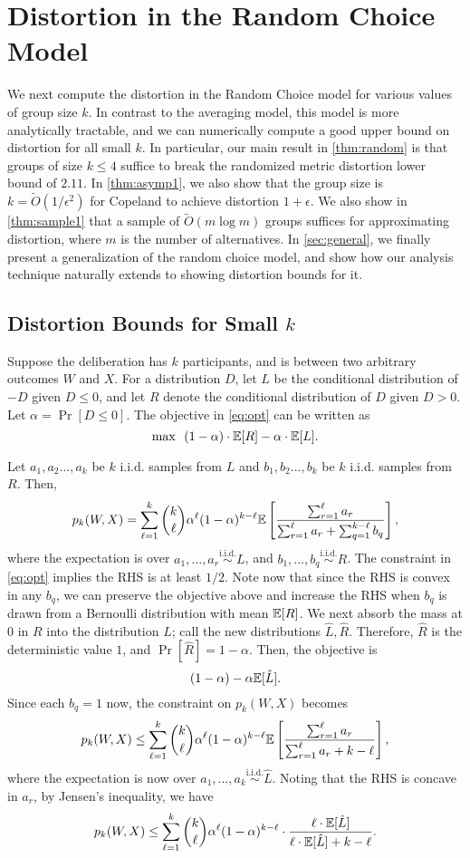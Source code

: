 \section{Distortion in the Random Choice Model}
\label{sec:random}
We next compute the distortion in the Random Choice model for various values of group size $k$. In contrast to the averaging model, this model is more analytically tractable, and we can numerically compute a good upper bound on distortion for all small $k$. In particular, our main result in \cref{thm:random} is that groups of size $k \le 4$ suffice to break the randomized metric distortion lower bound of $2.11$. In \cref{thm:asymp1}, we also show that the group size is $k = \tilde{O}(1/\epsilon^2)$ for Copeland to achieve distortion $1+\epsilon$. We also show in \cref{thm:sample1} that a sample of $\tilde{O}(m \log m)$ groups suffices for approximating distortion, where $m$ is the number of alternatives.  In \cref{sec:general}, we finally present a generalization of the random choice model, and show how our analysis technique naturally extends to showing distortion bounds for it.

\subsection{Distortion Bounds for Small $k$}
\label{sec:random_small}
Suppose the deliberation has $k$ participants, and is between two arbitrary outcomes $W$ and $X$. For a distribution $D$, let $L$ be the conditional distribution of $-D$ given $D \le 0$, and let $R$ denote the conditional distribution of $D$ given $D > 0$. Let $\alpha = \Pr[D \le 0]$. The objective in \cref{eq:opt} can be written as
$$ \max \ \ (1-\alpha) \cdot \mathbb{E}[R] - \alpha \cdot \mathbb{E}[L].$$

Let $a_1, a_2 \ldots, a_k$ be $k$ i.i.d. samples from $L$ and $b_1, b_2 \ldots, b_k$ be $k$ i.i.d. samples from $R$. Then,
$$ p_k(W,X) = \sum_{\ell = 1}^k {k \choose \ell} \alpha^{\ell} (1-\alpha)^{k-\ell} \mathbb{E}\left[ \frac{\sum_{r = 1}^{\ell} a_r}{\sum_{r=1}^{\ell} a_r + \sum_{q=1}^{k-\ell} b_q } \right],$$
where the expectation is over $a_1,\ldots, a_r \overset{\text{i.i.d.}}{\sim} L$, and $b_1,\ldots, b_q \overset{\text{i.i.d.}}{\sim}  R$. The constraint in \cref{eq:opt} implies the RHS is at least $1/2$. 
Note now that since the RHS is convex in any $b_q$, we can preserve the objective above and increase the RHS when $b_q$ is drawn from a Bernoulli distribution with mean $\mathbb{E}[R]$. We next absorb the mass at $0$ in $R$ into the distribution $L$; call the new distributions $\hat{L}, \hat{R}$. Therefore, $\hat{R}$ is the deterministic value $1$, and $\Pr[\hat{R}] = 1-\alpha$. Then, the objective is
$$ (1-\alpha) - \alpha \mathbb{E}[\hat{L}].$$
Since each $b_q = 1$ now, the constraint on $p_k(W,X) $  becomes
$$ p_k(W,X) \le \sum_{\ell = 1}^k {k \choose \ell} \alpha^{\ell} (1-\alpha)^{k-\ell} \mathbb{E}\left[ \frac{\sum_{r = 1}^{\ell} a_r}{\sum_{r=1}^{\ell} a_r + k-\ell } \right],$$
where the expectation is now over $a_1,\ldots,a_k\overset{\text{i.i.d.}}{\sim} \hat{L}$. Noting that the RHS is concave in $a_r$, by Jensen's inequality, we have
$$ p_k(W,X) \le \sum_{\ell = 1}^k {k \choose \ell} \alpha^{\ell} (1-\alpha)^{k-\ell} \cdot \frac{\ell \cdot \mathbb{E}[\hat{L}]}{\ell \cdot \mathbb{E}[\hat{L}] + k-\ell }. $$

